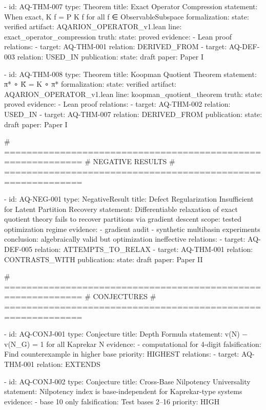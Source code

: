   - id: AQ-THM-007
    type: Theorem
    title: Exact Operator Compression
    statement: When exact, K f = P K f for all f ∈ ObservableSubspace
    formalization:
      state: verified
      artifact: AQARION_OPERATOR_v1.lean
      line: exact_operator_compression
    truth:
      state: proved
    evidence:
      - Lean proof
    relations:
      - target: AQ-THM-001
        relation: DERIVED_FROM
      - target: AQ-DEF-003
        relation: USED_IN
    publication:
      state: draft
      paper: Paper I

  - id: AQ-THM-008
    type: Theorem
    title: Koopman Quotient Theorem
    statement: π* ∘ K̃ = K ∘ π*
    formalization:
      state: verified
      artifact: AQARION_OPERATOR_v1.lean
      line: koopman_quotient_theorem
    truth:
      state: proved
    evidence:
      - Lean proof
    relations:
      - target: AQ-THM-002
        relation: USED_IN
      - target: AQ-THM-007
        relation: DERIVED_FROM
    publication:
      state: draft
      paper: Paper I

  # ============================================================
  # NEGATIVE RESULTS
  # ============================================================

  - id: AQ-NEG-001
    type: NegativeResult
    title: Defect Regularization Insufficient for Latent Partition Recovery
    statement: Differentiable relaxation of exact quotient theory fails to recover partitions via gradient descent
    scope: tested optimization regime
    evidence:
      - gradient audit
      - synthetic multibasin experiments
    conclusion: algebraically valid but optimization ineffective
    relations:
      - target: AQ-DEF-005
        relation: ATTEMPTS_TO_RELAX
      - target: AQ-THM-001
        relation: CONTRASTS_WITH
    publication:
      state: draft
      paper: Paper II

  # ============================================================
  # CONJECTURES
  # ============================================================

  - id: AQ-CONJ-001
    type: Conjecture
    title: Depth Formula
    statement: v(N) − v(N_G) = 1 for all Kaprekar N
    evidence:
      - computational for 4-digit
    falsification: Find counterexample in higher base
    priority: HIGHEST
    relations:
      - target: AQ-THM-001
        relation: EXTENDS

  - id: AQ-CONJ-002
    type: Conjecture
    title: Cross-Base Nilpotency Universality
    statement: Nilpotency index is base-independent for Kaprekar-type systems
    evidence:
      - base 10 only
    falsification: Test bases 2–16
    priority: HIGH

